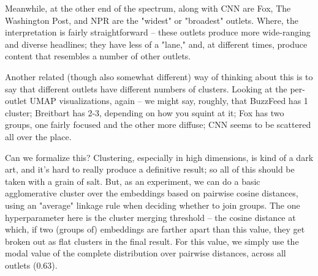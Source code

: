 \documentclass{scrartcl}
\begin{document}
Meanwhile, at the other end of the spectrum, along with CNN are Fox, The Washington Post, and NPR are the "widest" or "broadest" outlets. Where, the interpretation is fairly straightforward -- these outlets produce more wide-ranging and diverse headlines; they have less of a "lane," and, at different times, produce content that resembles a number of other outlets.

Another related (though also somewhat different) way of thinking about this is to say that different outlets have different numbers of clusters. Looking at the per-outlet UMAP visualizations, again -- we might say, roughly, that BuzzFeed has 1 cluster; Breitbart has 2-3, depending on how you squint at it; Fox has two groups, one fairly focused and the other more diffuse; CNN seems to be scattered all over the place.

Can we formalize this? Clustering, especially in high dimensions, is kind of a dark art, and it's hard to really produce a definitive result; so all of this should be taken with a grain of salt. But, as an experiment, we can do a basic agglomerative cluster over the embeddings based on pairwise cosine distances, using an "average" linkage rule when deciding whether to join groups. The one hyperparameter here is the cluster merging threshold -- the cosine distance at which, if two (groups of) embeddings are farther apart than this value, they get broken out as flat clusters in the final result. For this value, we simply use the modal value of the complete distribution over pairwise distances, across all outlets (0.63).
\end{document}
